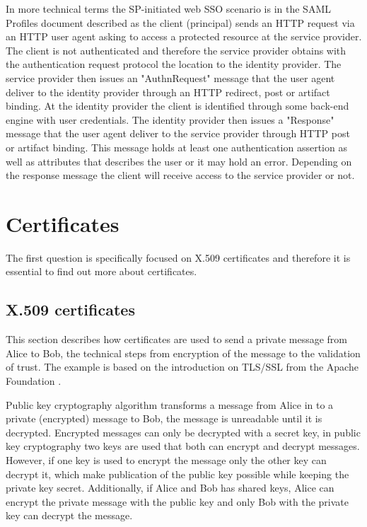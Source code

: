 In more technical terms the SP-initiated web SSO scenario is in the SAML Profiles document \cite[p.~15]{pdf:oasis-open-profiles} described as the client (principal) sends an HTTP request via an HTTP user agent asking to access a protected resource at the service provider.
The client is not authenticated and therefore the service provider obtains with the authentication request protocol the location to the identity provider. The service provider then issues an "AuthnRequest" message that the user agent deliver to the identity provider through an HTTP redirect, post or artifact binding.
At the identity provider the client is identified through some back-end engine with user credentials.
The identity provider then issues a "Response" message that the user agent deliver to the service provider through HTTP post or artifact binding.
This message holds at least one authentication assertion as well as attributes that describes the user or it may hold an error.
Depending on the response message the client will receive access to the service provider or not.

\section{Certificates}
The first question is specifically focused on X.509 certificates and therefore it is essential to find out more about certificates.

\subsection{X.509 certificates}
This section describes how certificates are used to send a private message from Alice to Bob, the technical steps from encryption 
of the message to the validation of trust.
The example is based on the introduction on TLS/SSL from the Apache Foundation \cite{website:ssl_intro}.

Public key cryptography algorithm transforms a message from Alice in to a private (encrypted) message to Bob, 
the message is unreadable until it is decrypted. 
Encrypted messages can only be decrypted with a secret key, in public key cryptography two keys are used that both can encrypt and 
decrypt messages. 
However, if one key is used to encrypt the message only the other key can decrypt it, which make publication of the public key 
possible while keeping the private key secret. 
Additionally, if Alice and Bob has shared keys, Alice can encrypt the private message with the public key and only Bob 
with the private key can decrypt the message.

